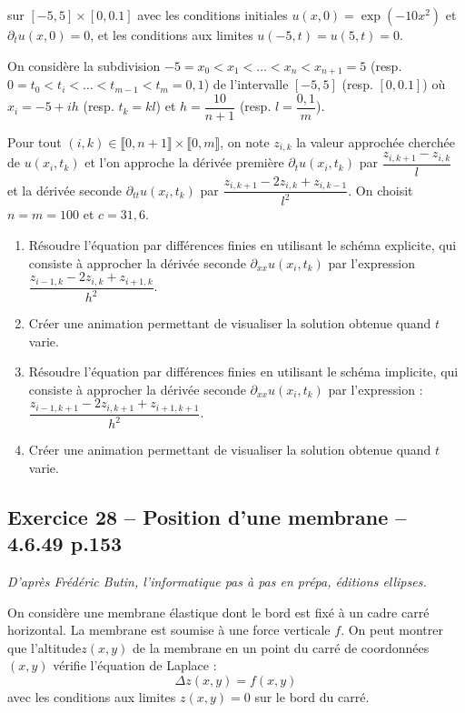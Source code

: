 \documentclass[10pt,fleqn]{article} %
\begin{document}
\begin{multicols}{2}
sur $[-5,5] \times [0,0.1]$ avec les conditions initiales $u(x,0)=\exp\left( {-10 x^2}\right)$ et 
$\partial_t u(x,0)=0$, et les conditions aux limites $u(-5,t)=u(5,t)=0$. 

On considère la subdivision $-5=x_0<x_1<\ldots <x_n <  x_{n+1} =5$ (resp. 
$0=t_0<t_i<\ldots<t_{m-1}<t_m=0,1$) de l'intervalle $[-5,5]$ (resp. $[0,0.1]$) où 
$x_i=-5+ih$ (resp. $t_k=kl$) et $h=\dfrac{10}{n+1}$ (resp. $l=\dfrac{0,1}{m}$).

Pour tout $(i,k) \in \llbracket 0,n+1 \rrbracket \times\llbracket 0,m \rrbracket $, on note $z_{i,k}$ la valeur approchée cherchée de $u\left(x_i,t_k\right)$ et l'on approche la dérivée première 
$\partial_{t} u(x_i,t_k)$ par $\dfrac{z_{i,k+1}-z_{i,k}}{l}$ et la dérivée seconde $\partial_{tt} u(x_i,t_k)$ par $\dfrac{z_{i,k+1}-2z_{i,k}+z_{i,k-1}}{l^2}$. On choisit $n=m=100$ et $c=31,6$.

\begin{enumerate}
\item Résoudre l'équation par différences finies en utilisant le schéma explicite, qui consiste à approcher la dérivée seconde $\partial_{xx} u(x_i,t_k)$ par l'expression $\dfrac{z_{i-1,k}-2z_{i,k}+z_{i+1,k}}{h^2}$.
\item Créer une animation permettant de visualiser la solution obtenue quand $t$ varie. 
\item Résoudre l'équation par différences finies en utilisant le schéma implicite, qui consiste à approcher la dérivée seconde $\partial_{xx} u(x_i,t_k)$ par l'expression :
$\dfrac{z_{i-1,k+1}-2z_{i,k+1}+z_{i+1,k+1}}{h^2}$.
\item Créer une animation permettant de visualiser la solution obtenue quand $t$ varie. 
\end{enumerate}

\subsection*{Exercice 28 -- Position d'une membrane -- 4.6.49 p.153}
\begin{flushright}
\textit{D'après Frédéric Butin, l'informatique pas à pas en prépa, éditions ellipses.}
\end{flushright}

On considère une membrane élastique dont le bord est fixé à un cadre carré horizontal. La membrane est soumise à une force verticale $f$. On peut montrer que l'altitude$z(x,y)$ de la membrane en un point du carré de coordonnées $(x,y)$ vérifie l'équation de Laplace :
$$
\Delta z\left( x,y\right) = f(x,y)
$$
 avec les conditions aux limites $z(x,y)=0$ sur le bord du carré. 
 

\end{multicols}
\end{document}
